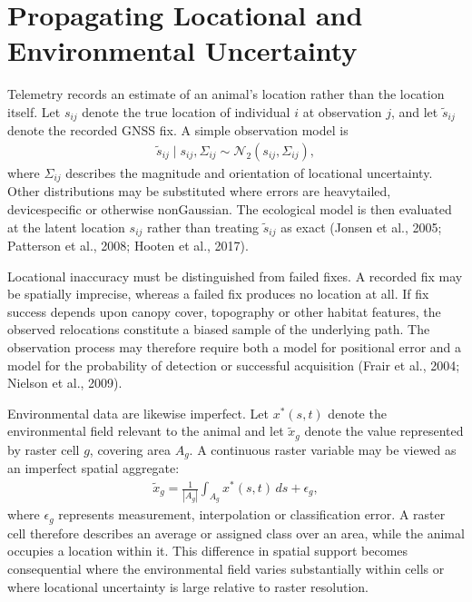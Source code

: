 \documentclass[letterpaper,10pt,english]{sphinxmanual}
\begin{document}
\section{Propagating Locational and Environmental Uncertainty}
\label{\detokenize{theory:propagating-locational-and-environmental-uncertainty}}
\sphinxAtStartPar
Telemetry records an estimate of an animal’s location rather than the location itself. Let \(s_{ij}\) denote the true location of individual \(i\) at observation \(j\), and let \(\tilde{s}_{ij}\) denote the recorded GNSS fix. A simple observation model is
\begin{equation*}
\begin{split}
\tilde{s}_{ij}
\mid
s_{ij},\Sigma_{ij}
\sim
\mathcal{N}_2
\left(
s_{ij},
\Sigma_{ij}
\right),
\end{split}
\end{equation*}
\sphinxAtStartPar
where \(\Sigma_{ij}\) describes the magnitude and orientation of locational uncertainty. Other distributions may be substituted where errors are heavy\sphinxhyphen{}tailed, device\sphinxhyphen{}specific or otherwise non\sphinxhyphen{}Gaussian. The ecological model is then evaluated at the latent location \(s_{ij}\) rather than treating \(\tilde{s}_{ij}\) as exact (Jonsen et al., 2005; Patterson et al., 2008; Hooten et al., 2017).

\sphinxAtStartPar
Locational inaccuracy must be distinguished from failed fixes. A recorded fix may be spatially imprecise, whereas a failed fix produces no location at all. If fix success depends upon canopy cover, topography or other habitat features, the observed relocations constitute a biased sample of the underlying path. The observation process may therefore require both a model for positional error and a model for the probability of detection or successful acquisition (Frair et al., 2004; Nielson et al., 2009).

\sphinxAtStartPar
Environmental data are likewise imperfect. Let \(x^{*}(s,t)\) denote the environmental field relevant to the animal and let \(\tilde{x}_g\) denote the value represented by raster cell \(g\), covering area \(A_g\). A continuous raster variable may be viewed as an imperfect spatial aggregate:
\begin{equation*}
\begin{split}
\tilde{x}_g
=
\frac{1}{|A_g|}
\int_{A_g}
x^{*}(s,t)\,ds
+
\epsilon_g,
\end{split}
\end{equation*}
\sphinxAtStartPar
where \(\epsilon_g\) represents measurement, interpolation or classification error. A raster cell therefore describes an average or assigned class over an area, while the animal occupies a location within it. This difference in spatial support becomes consequential where the environmental field varies substantially within cells or where locational uncertainty is large relative to raster resolution.
\end{document}
